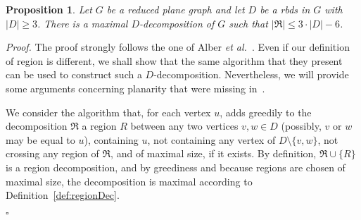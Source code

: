 \documentclass[a4paper,11pt]{article}
\newtheorem{prop} {Proposition}
\newcommand{\drb}    [0] {rbds\xspace}
\newenvironment{proof}{\noindent \textit{Proof. }}{\hfill$\square$\vspace{.2cm}}
\begin{document}
\begin{prop} \label{prop_nb_reg}
Let $G$ be a reduced plane graph and let $D$ be a \drb in $G$ with $|D| \geq 3$.
There is a maximal $D$-decomposition of $G$ such that $|\Re| \leq 3 \cdot |D| - 6$.
\end{prop}

\begin{proof} The proof strongly follows the one of Alber \emph{et al.}~\cite[Lemma 5 and Proposition 1]{AFN04}. Even if our definition of region is different, we shall show that the same algorithm that they present can be used to construct such a $D$-decomposition. Nevertheless, we will provide some arguments concerning planarity that were missing in~\cite{AFN04}.

We consider the algorithm that, for each vertex $u$, adds greedily to the decomposition $\Re$ a region $R$ between any two vertices $v,w \in D$ (possibly, $v$ or $w$ may be equal to $u$), containing $u$,
not containing any vertex of $D \setminus \{v,w\}$,
not crossing any region of $\Re$, and of maximal size, if it exists.
By definition, $\Re \cup \{R\}$ is a region decomposition, and by greediness and because regions are chosen of maximal size, the decomposition is maximal according to Definition~\ref{def:regionDec}.


\end{proof}
\end{document}
